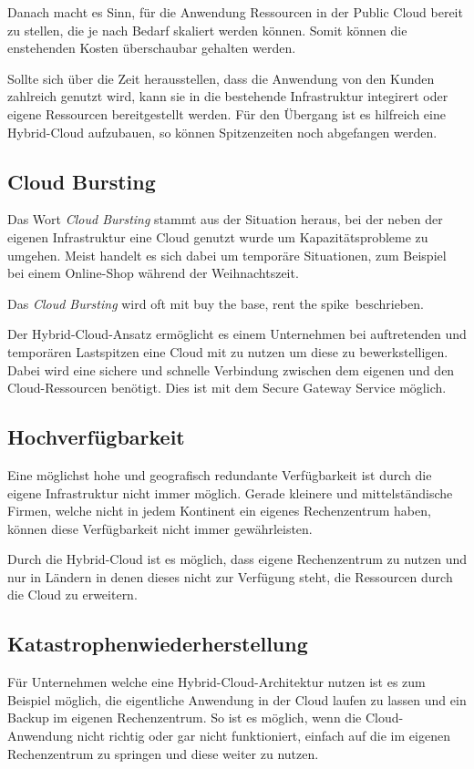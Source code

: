 Danach macht es Sinn, für die Anwendung Ressourcen in der Public Cloud bereit zu stellen, die je nach Bedarf skaliert
werden können. Somit können die enstehenden Kosten überschaubar gehalten werden.

Sollte sich über die Zeit herausstellen, dass die Anwendung von den Kunden zahlreich genutzt wird, kann sie in die
bestehende Infrastruktur integirert oder eigene Ressourcen bereitgestellt werden. Für den Übergang ist es hilfreich
eine Hybrid-Cloud aufzubauen, so können Spitzenzeiten noch abgefangen werden.

\subsection{Cloud Bursting}
Das Wort \textit{Cloud Bursting} stammt aus der Situation heraus, bei der neben der eigenen Infrastruktur eine Cloud
genutzt wurde um Kapazitätsprobleme zu umgehen. Meist handelt es sich dabei um temporäre Situationen, zum Beispiel bei
einem Online-Shop während der Weihnachtszeit.

Das \textit{Cloud Bursting} wird oft mit \glqq buy the base, rent the spike\grqq~beschrieben.

Der Hybrid-Cloud-Ansatz ermöglicht es einem Unternehmen bei auftretenden und temporären Lastspitzen eine Cloud mit zu
nutzen um diese zu bewerkstelligen. Dabei wird eine sichere und schnelle Verbindung zwischen dem eigenen und den
Cloud-Ressourcen benötigt. Dies ist mit dem Secure Gateway Service möglich.

\subsection{Hochverfügbarkeit}
Eine möglichst hohe und geografisch redundante Verfügbarkeit ist durch die eigene Infrastruktur nicht immer möglich.
Gerade kleinere und mittelständische Firmen, welche nicht in jedem Kontinent ein eigenes Rechenzentrum haben, können diese
Verfügbarkeit nicht immer gewährleisten.

Durch die Hybrid-Cloud ist es möglich, dass eigene Rechenzentrum zu nutzen und nur in Ländern in denen dieses nicht zur
Verfügung steht, die Ressourcen durch die Cloud zu erweitern.

\subsection{Katastrophenwiederherstellung}
Für Unternehmen welche eine Hybrid-Cloud-Architektur nutzen ist es zum Beispiel möglich, die eigentliche Anwendung in
der Cloud laufen zu lassen und ein Backup im eigenen Rechenzentrum. So ist es möglich, wenn die Cloud-Anwendung
nicht richtig oder gar nicht funktioniert, einfach auf die im eigenen Rechenzentrum zu springen und diese weiter zu nutzen.

